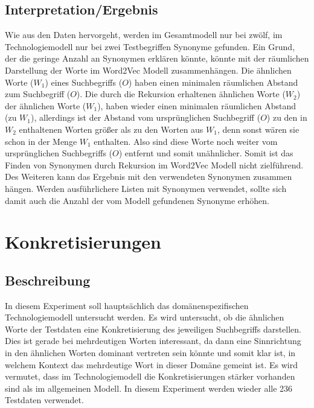 \documentclass[12pt,a4paper]{report}
\begin{document}
		\subsection*{Interpretation/Ergebnis}
		Wie aus den Daten hervorgeht, werden im Gesamtmodell nur bei zwölf, im Technologiemodell nur bei zwei Testbegriffen Synonyme gefunden.
		Ein Grund, der die geringe Anzahl an Synonymen erklären könnte, könnte mit der räumlichen Darstellung der Worte im Word2Vec Modell zusammenhängen. Die ähnlichen Worte ($W_1$) eines Suchbegriffs ($O$) haben einen minimalen räumlichen Abstand zum Suchbegriff ($O$). 
		Die durch die Rekursion erhaltenen ähnlichen Worte ($W_2$) der ähnlichen Worte ($W_1$), haben wieder einen minimalen räumlichen Abstand (zu $W_1$), allerdings ist der Abstand vom ursprünglichen Suchbegriff ($O$) zu den in $W_2$ enthaltenen Worten größer als zu den Worten aus $W_1$, denn sonst wären sie schon in der Menge $W_1$ enthalten. Also sind diese Worte noch weiter vom ursprünglichen Suchbegriffs ($O$) entfernt und somit unähnlicher. Somit ist das Finden von Synonymen durch Rekursion im Word2Vec Modell nicht zielführend.\\
		Des Weiteren kann das Ergebnis mit den verwendeten Synonymen zusammen hängen. Werden ausführlichere Listen mit Synonymen verwendet, sollte sich damit auch die Anzahl der vom Modell gefundenen Synonyme erhöhen.\\
		
		
	
	\section{Konkretisierungen}
		\subsection*{Beschreibung}
		In diesem Experiment soll hauptsächlich das domänenspezifischen Technologiemodell untersucht werden. Es wird untersucht, ob die ähnlichen Worte der Testdaten eine Konkretisierung des jeweiligen Suchbegriffs darstellen.	Dies ist gerade bei mehrdeutigen Worten interessant, da dann eine Sinnrichtung in den ähnlichen Worten dominant vertreten sein könnte und somit klar ist, in welchem Kontext das mehrdeutige Wort in dieser Domäne gemeint ist. Es wird vermutet, dass im Technologiemodell die Konkretisierungen stärker vorhanden sind als im allgemeinen Modell. In diesem Experiment werden wieder alle 236 Testdaten verwendet.\\
		
\end{document}
